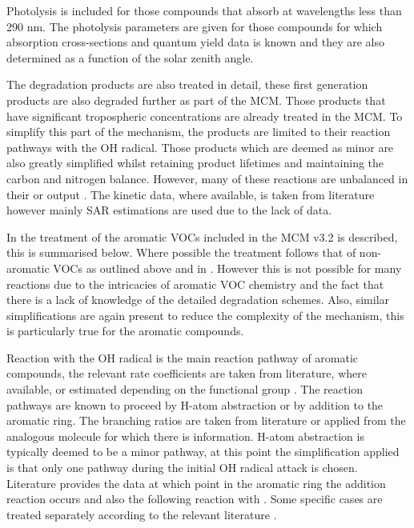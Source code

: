 Photolysis is included for those compounds that absorb at wavelengths less than 290 nm. 
The photolysis parameters are given for those  compounds for which absorption cross-sections and quantum yield data is known and they are also determined as a function of the solar zenith angle. 

The degradation products are also treated in detail, these first generation products are also degraded further as part of the MCM. 
Those products that have significant tropospheric concentrations are already treated in the MCM. 
To simplify this part of the mechanism, the products are limited to their reaction pathways with the OH radical. 
Those products which are deemed as minor are also greatly simplified whilst retaining product lifetimes and maintaining the carbon and nitrogen balance. 
However, many of these reactions are unbalanced in their  or  output \citep{Jenkin:1997}. 
The kinetic data, where available, is taken from literature however mainly SAR estimations are used due to the lack of data.

In \citep{Jenkin:2003} the treatment of the aromatic VOCs included in the MCM v3.2 is described, this is summarised below. 
Where possible the treatment follows that of non-aromatic VOCs as outlined above and in \citep{Saunders:2003}. 
However this is not possible for many reactions due to the intricacies of aromatic VOC chemistry and the fact that there is a lack of knowledge of the detailed degradation schemes. 
Also, similar simplifications are again present to reduce the complexity of the mechanism, this is particularly true for the  aromatic compounds.

Reaction with the OH radical is the main reaction pathway of aromatic compounds, the relevant rate coefficients are taken from literature, where available, or estimated depending on the functional group \citep{Jenkin:2003}. 
The reaction pathways are known to proceed by H-atom abstraction or by addition to the aromatic ring. 
The branching ratios are taken from literature or applied from the analogous molecule for which there is information. 
H-atom abstraction is typically deemed to be a minor pathway, at this point the simplification applied is that only one pathway during the initial OH radical attack is chosen. 
Literature provides the data at which point in the aromatic ring the addition reaction occurs and also the following reaction with . 
Some specific cases are treated separately according to the relevant literature \citep{Jenkin:2003}.

